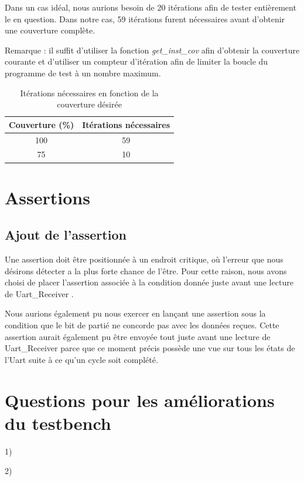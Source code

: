 \documentclass[12pt, titlepage]{article}
\newcommand{\ureceiver}{Uart\_Receiver }
\begin{document}
		Dans un cas idéal, nous aurions besoin de 20 itérations afin de tester entièrement le \cvg en question. Dans notre cas, 59 itérations furent nécessaires avant d'obtenir une couverture complète.
        
    	Remarque : il suffit d'utiliser la fonction \emph{get\_inst\_cov} afin d'obtenir la couverture courante et d'utiliser un compteur d'itération afin de limiter la boucle du programme de test à un nombre maximum.
    	
    	 \begin{table}[h!]
			 	\begin{center}
			 		\caption{Itérations nécessaires en fonction de la couverture désirée}
			 		\label{tab:cvgit}
			 		\begin{tabular}{c|c}
			 			Couverture (\%) & Itérations nécessaires\\
			 			\midrule
						   100   & 59 \\
                           75   & 10 \\
			 		\end{tabular}
			 	\end{center}
		 \end{table}
    	
\section{Assertions}
  \subsection{Ajout de l'assertion}
Une assertion doit être positionnée à un endroit critique, où l'erreur que nous désirons détecter a la plus forte chance de l'être. Pour cette raison, nous avons choisi de placer l'assertion associée à la condition donnée juste avant une lecture de \ureceiver.

Nous aurions également pu nous exercer en lançant une assertion sous la condition que le bit de partié ne concorde pas avec les données reçues. Cette assertion aurait également pu être envoyée tout juste avant une lecture de \ureceiver parce que ce moment précis possède une vue sur tous les états de l'Uart suite à ce qu'un cycle soit complété.

\section{Questions pour les améliorations du testbench}
	1)

	2)
\end{document}
